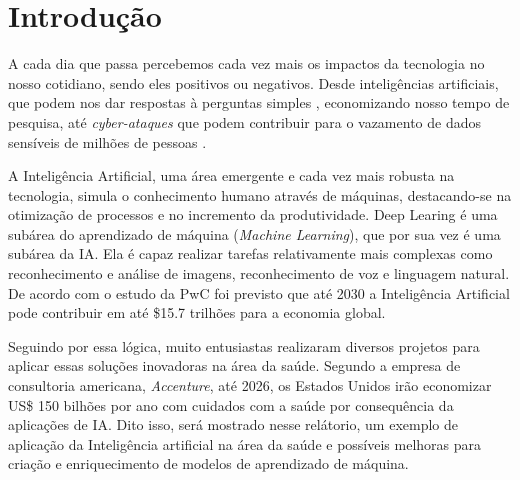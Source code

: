 
\chapter{Introdução}
\label{cha:Introdução}

A cada dia que passa percebemos cada vez mais os impactos da tecnologia no nosso cotidiano, sendo eles positivos ou negativos. Desde inteligências artificiais, que podem nos dar respostas à perguntas simples \cite{Haque_2023}, economizando nosso tempo de pesquisa, até \textit{cyber-ataques} que podem contribuir para o vazamento de dados sensíveis de milhões de pessoas \cite{10.11648/j.epes.20221106.12}.

A Inteligência Artificial, uma área emergente e cada vez mais robusta na tecnologia, simula o conhecimento humano através de máquinas, destacando-se na otimização de processos e no incremento da produtividade. Deep Learing é uma subárea do aprendizado de máquina (\textit{Machine Learning}), que por sua vez é uma subárea da IA. Ela é capaz realizar tarefas relativamente mais complexas como reconhecimento e análise de imagens, reconhecimento de voz e linguagem natural. De acordo com o estudo da PwC foi previsto que até 2030 a Inteligência Artificial pode contribuir em até \$15.7 trilhões para a economia global.\cite{PWC1}

Seguindo por essa lógica, muito entusiastas realizaram diversos projetos para aplicar essas soluções inovadoras na área da saúde. Segundo a empresa de consultoria americana, \textit{Accenture}, até 2026, os Estados Unidos irão economizar US\$ 150 bilhões por ano com cuidados com a saúde por consequência da aplicações de IA.\cite{IST1} Dito isso, será mostrado nesse relátorio, um exemplo de aplicação da Inteligência artificial na área da saúde e possíveis melhoras para criação e enriquecimento de modelos de aprendizado de máquina.



\nocite{7422082}
\nocite{7404285}
\nocite{doi:10.1148/ryai.2019180015}
\nocite{7950512}
\nocite{doi:10.1080/21681163.2015.1124249}
\nocite{Hesamian_Jia_He_Kennedy_2019}
\nocite{Gao_Han_Li_Ji_Zhang_Sun_2018}
\nocite{7412749}
\nocite{7501527}
\nocite{6975210}
\nocite{7590963}
\nocite{AREVALO2016248}
\nocite{7426413}
\nocite{pmlr-v136-phillips20a}
\nocite{rajpurkar2017chexnet}
\nocite{7801947}
\nocite{7545996}
\nocite{SUN20174}
\nocite{10.1007/978-3-319-10590-1_53}
